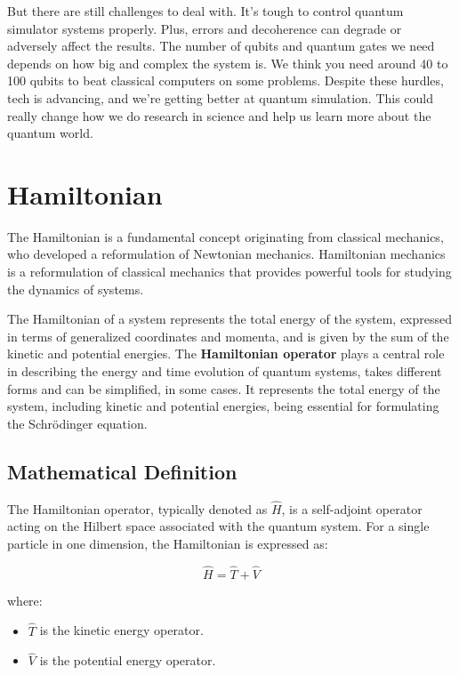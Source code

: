 But there are still challenges to deal with. It’s tough to control quantum simulator systems properly. Plus, errors and decoherence can degrade or adversely affect the results. The number of qubits and quantum gates we need depends on how big and complex the system is. We think you need around 40 to 100 qubits to beat classical computers on some problems. Despite these hurdles, tech is advancing, and we’re getting better at quantum simulation. This could really change how we do research in science and help us learn more about the quantum world.

\section{Hamiltonian}

The Hamiltonian is a fundamental concept originating from classical mechanics, who developed a reformulation of Newtonian mechanics. Hamiltonian mechanics is a reformulation of classical mechanics that provides powerful tools for studying the dynamics of systems. 

The Hamiltonian of a system represents the total energy of the system, expressed in terms of generalized coordinates and momenta, and is given by the sum of the kinetic and potential energies. The \textbf{Hamiltonian operator} plays a central role in describing the energy and time evolution of quantum systems, takes different forms and can be simplified, in some cases. It represents the total energy of the system, including kinetic and potential energies, being essential for formulating the Schrödinger equation.\cite{wiki:hamiltonian_quantum_mechanics}

\subsection{Mathematical Definition}

The Hamiltonian operator, typically denoted as \( \hat{H} \), is a self-adjoint operator acting on the Hilbert space associated with the quantum system. For a single particle in one dimension, the Hamiltonian is expressed as:

\[
\hat{H} = \hat{T} + \hat{V}
\]

where:

\begin{itemize}
    \item \( \hat{T} \) is the kinetic energy operator.
    \item \( \hat{V} \) is the potential energy operator.
\end{itemize}

